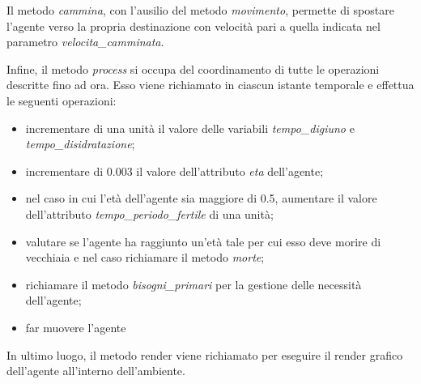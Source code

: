 \documentclass[11pt]{article}
\begin{document}
Il metodo \emph{cammina}, con l'ausilio del metodo \emph{movimento}, permette di spostare l'agente verso la propria destinazione con velocità pari a quella indicata nel parametro \emph{velocita\_camminata}. 

Infine, il metodo \emph{process} si occupa del coordinamento di tutte le operazioni descritte fino ad ora. Esso viene richiamato in ciascun istante temporale e effettua le seguenti operazioni:
\begin{itemize}
    \item incrementare di una unità il valore delle variabili \emph{tempo\_digiuno} e \emph{tempo\_disidratazione};
    \item incrementare di 0.003 il valore dell'attributo \emph{eta} dell'agente;
    \item nel caso in cui l'età dell'agente sia maggiore di 0.5, aumentare il valore dell'attributo \emph{tempo\_periodo\_fertile} di una unità;
    \item valutare se l'agente ha raggiunto un'età tale per cui esso deve morire di vecchiaia e nel caso richiamare il metodo \emph{morte};
    \item richiamare il metodo \emph{bisogni\_primari} per la gestione delle necessità dell'agente;
    \item far muovere l'agente
\end{itemize}

In ultimo luogo, il metodo render viene richiamato per eseguire il render grafico dell'agente all'interno dell'ambiente.
\end{document}
